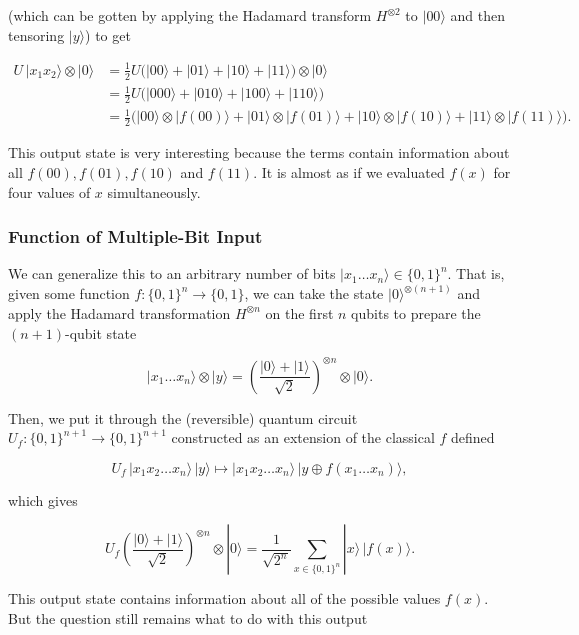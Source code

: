 \documentclass{article}
\theoremstyle{definition}
\begin{document}
      (which can be gotten by applying the Hadamard transform $H^{\otimes 2}$ to $|00\rangle$ and then tensoring $|y\rangle$) to get

      \begin{align*}
        U\,|x_1 x_2 \rangle \otimes |0\rangle & = \frac{1}{2} U \big( |00\rangle + |01\rangle + |10\rangle + |11\rangle \big) \otimes |0\rangle \\
        & = \frac{1}{2} U \big(|000\rangle + |010\rangle + |100\rangle + |110\rangle \big) \\
        & = \frac{1}{2} \big( |00\rangle \otimes |f(00)\rangle + |01\rangle \otimes |f(01)\rangle + |10\rangle \otimes |f(10)\rangle + |11\rangle \otimes |f(11)\rangle \big).
      \end{align*}

      This output state is very interesting because the terms contain information about all $f(00), f(01), f(10)$ and $f(11)$. It is almost as if we evaluated $f(x)$ for four values of $x$ simultaneously.

      \subsubsection{Function of Multiple-Bit Input}

      We can generalize this to an arbitrary number of bits $|x_1 \ldots x_n\rangle \in \{0, 1\}^n$. That is, given some function $f: \{0, 1\}^n \longrightarrow \{0, 1\}$, we can take the state $|0\rangle^{\otimes (n+1)}$ and apply the Hadamard transformation $H^{\otimes n}$ on the first $n$ qubits to prepare the $(n+1)$-qubit state 

        \[|x_1 \ldots x_n \rangle \otimes |y\rangle = \left( \frac{|0\rangle + |1\rangle}{\sqrt{2}}\right)^{\otimes n} \otimes |0\rangle.\]

      Then, we put it through the (reversible) quantum circuit $U_f: \{0, 1\}^{n+1} \longrightarrow \{0, 1\}^{n+1}$ constructed as an extension of the classical $f$ defined 

        \[U_f \, |x_1 x_2 \ldots x_n \rangle \, |y\rangle \mapsto |x_1 x_2 \ldots x_n \rangle \, |y \oplus f(x_1 \ldots x_n)\rangle,\]

      which gives 

        \[U_f \left( \frac{|0\rangle + |1\rangle}{\sqrt{2}}\right)^{\otimes n} \otimes |0\rangle = \frac{1}{\sqrt{2^n}} \sum_{x \in \{0, 1\}^n} |x\rangle \, |f(x)\rangle.\]

      This output state contains information about all of the possible values $f(x)$. But the question still remains what to do with this output 
\end{document}

